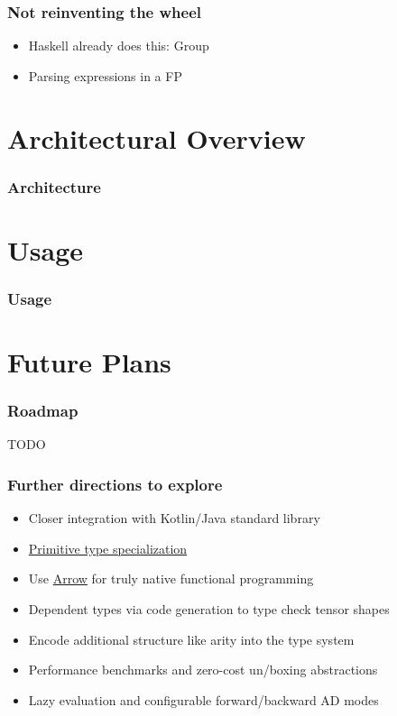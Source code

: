 \documentclass{beamer}
\begin{document}
    \begin{frame}
        \frametitle{Not reinventing the wheel}
        \begin{itemize}
            \item Haskell already does this: Group
            \item Parsing expressions in a FP
        \end{itemize}
    \end{frame}


    \section{Architectural Overview}\label{sec:third-section}

    \begin{frame}
        \frametitle{Architecture}
    \end{frame}

    \section{Usage}\label{sec:fourth-section}

    \begin{frame}
        \frametitle{Usage}
    \end{frame}

    \section{Future Plans}\label{sec:fifth-section}

    \begin{frame}
        \frametitle{Roadmap}
        \item TODO
    \end{frame}

    \begin{frame}
        \frametitle{Further directions to explore}
        \begin{itemize}
            \item Closer integration with Kotlin/Java standard library
            \item \href{https://discuss.kotlinlang.org/t/primitive-type-specialization/11022/4}{Primitive type specialization}
            \item Use \href{https://arrow-kt.io/}{Arrow} for truly native functional programming
            \item Dependent types via code generation to type check tensor shapes
            \item Encode additional structure like arity into the type system
            \item Performance benchmarks and zero-cost un/boxing abstractions
            \item Lazy evaluation and configurable forward/backward AD modes
        \end{itemize}
    \end{frame}
\end{document}

